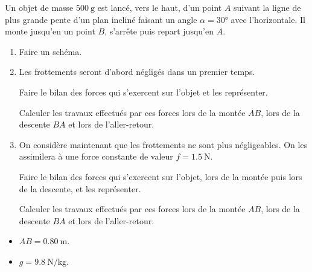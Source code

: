 Un objet de masse $\qty{500}{\g}$ est lancé, vers le haut, d'un point $A$
suivant la ligne de plus grande pente d'un plan incliné faisant un angle
$\alpha=\ang{30}$ avec l'horizontale. Il monte jusqu'en un point $B$, s'arrête
puis repart jusqu'en $A$.
\begin{enumerate}
    \item Faire un schéma.
    \item Les frottements seront d'abord négligés dans un premier temps.

          Faire le bilan des forces qui s'exercent sur l'objet et les
          représenter.
    
          Calculer les travaux effectués par ces forces lors de la montée $A B$,
          lors de la descente $B A$ et lors de l'aller-retour.
    \item On considère maintenant que les frottements ne sont plus négligeables.
          On les assimilera à une force constante de valeur $f=\qty{1.5}{\N}$.

          Faire le bilan des forces qui s'exercent sur l'objet, lors de la
          montée puis lors de la descente, et les représenter.
    
          Calculer les travaux effectués par ces forces lors de la montée $A B$,
          lors de la descente $B A$ et lors de l'aller-retour.
\end{enumerate}

\begin{donnees}
    \begin{itemize}
        \item $A B=\qty{0.80}{\m}$.
        \item $g=\qty{9.8}{\N\per\kg}$.
    \end{itemize}
\end{donnees}

